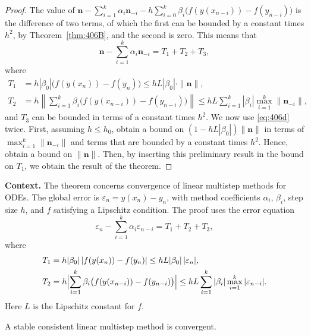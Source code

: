 \begin{proof}
The value of $\mathbf{n} - \sum_{i=1}^k \alpha_i \mathbf{n}_{-i} - h \sum_{i=0}^k \beta_i \big( f(y(x_{n-i})) - f(y_{n-i}) \big)$ is the difference of two terms, of which the first can be bounded by a constant times $h^2$, by Theorem~\ref{thm:406B}, and the second is zero. This means that
\[
\mathbf{n} - \sum_{i=1}^k \alpha_i \mathbf{n}_{-i} = T_1 + T_2 + T_3, \tag{406d}
\]
where
\begin{align*}
T_1 &= h|\beta_0| \big( f(y(x_n)) - f(y_n) \big) \leq h L |\beta_0| \cdot \| \mathbf{n} \|, \tag{406e} \\
T_2 &= h \left\| \sum_{i=1}^k \beta_i \big( f(y(x_{n-i})) - f(y_{n-i}) \big) \right\| \leq h L \sum_{i=1}^k |\beta_i| \max_{i=1}^k \| \mathbf{n}_{-i} \|, \tag{406f}
\end{align*}
and $T_3$ can be bounded in terms of a constant times $h^2$. We now use \eqref{eq:406d} twice. First, assuming $h \leq h_0$, obtain a bound on $(1 - h L |\beta_0|) \| \mathbf{n} \|$ in terms of $\max_{i=1}^k \| \mathbf{n}_{-i} \|$ and terms that are bounded by a constant times $h^2$. Hence, obtain a bound on $\| \mathbf{n} \|$. Then, by inserting this preliminary result in the bound on $T_1$, we obtain the result of the theorem.
\end{proof}

\noindent\textbf{Context.}
The theorem concerns convergence of linear multistep methods for ODEs. The global error is $\varepsilon_n = y(x_n) - y_n$, with method coefficients $\alpha_i$, $\beta_i$, step size $h$, and $f$ satisfying a Lipschitz condition. The proof uses the error equation
\[
\varepsilon_n - \sum_{i=1}^k \alpha_i \varepsilon_{n-i} = T_1 + T_2 + T_3,
\]
where
\begin{align*}
T_1 &= h|\beta_0|\,|f(y(x_n)) - f(y_n)| \le hL|\beta_0|\,|\varepsilon_n|,\\
T_2 &= h\Bigl|\sum_{i=1}^k \beta_i \bigl(f(y(x_{n-i})) - f(y_{n-i})\bigr)\Bigr| \le hL \sum_{i=1}^k |\beta_i| \max_{i=1}^k |\varepsilon_{n-i}|.
\end{align*}
Here $L$ is the Lipschitz constant for $f$.

\begin{theorem}

  \label{thm:406D}
A stable consistent linear multistep method is convergent.
\end{theorem}

